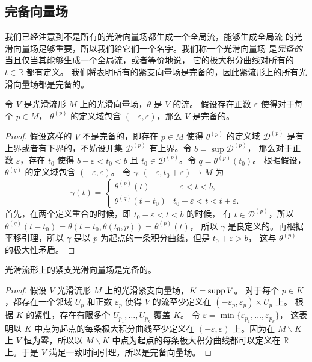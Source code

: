 \subsection{完备向量场}

我们已经注意到不是所有的光滑向量场都生成一个全局流，能够生成全局流
的光滑向量场足够重要，所以我们给它们一个名字。我们称一个光滑向量场
是\emph{完备的}当且仅当其能够生成一个全局流，或者等价地说，
它的极大积分曲线对所有的 $t\in \mathbb{R}$ 都有定义。
我们将表明所有的紧支向量场是完备的，因此紧流形上的所有光滑向量场都是完备的。

\begin{lemma}[一致时间引理]
  令 $V$ 是光滑流形 $M$ 上的光滑向量场，$\theta$ 是 $V$ 的流。
  假设存在正数 $\varepsilon$ 使得对于每个 $p\in M$，
  $\theta^{(p)}$ 的定义域包含 $(-\varepsilon,\varepsilon)$，那么 $V$
  是完备的。
\end{lemma}
\begin{proof}
  假设这样的 $V$ 不是完备的，即存在 $p\in M$ 使得 $\theta^{(p)}$ 的定义域
  $\mathcal{D}^{(p)}$ 是有上界或者有下界的，不妨设开集 $\mathcal D^{(p)}$ 有上界。令 $b=\sup \mathcal{D}^{(p)}$，
  那么对于正数 $\varepsilon$，存在 $t_0$ 使得 $b-\varepsilon<t_0<b$
  且 $t_0\in \mathcal D^{(p)}$。令 $q=\theta^{(p)}(t_0)$。
  根据假设，$\theta^{(q)}$ 的定义域包含 $(-\varepsilon,\varepsilon)$。
  令 $\gamma:(-\varepsilon,t_0+\varepsilon)\to M$ 为
  \[
    \gamma(t)=\begin{cases}
      \theta^{(p)}(t) & -\varepsilon<t< b,\\
      \theta^{(q)}(t-t_0) & t_0-\varepsilon< t<t+\varepsilon.
    \end{cases}
  \]
  首先，在两个定义重合的时候，即 $t_0-\varepsilon<t<b$ 的时候，
  有 $t\in \mathcal{D}^{(p)}$，所以 $\theta^{(q)}(t-t_0)
  =\theta(t-t_0,\theta(t_0,p))=\theta^{(p)}(t)$，
  所以 $\gamma$ 是良定义的。再根据平移引理，所以 $\gamma$
  是以 $p$ 为起点的一条积分曲线，但是 $t_0+\varepsilon>b$，
  这与 $\theta^{(p)}$ 的极大性矛盾。
\end{proof}

\begin{theorem}
  光滑流形上的紧支光滑向量场是完备的。
\end{theorem}
\begin{proof}
  假设 $V$ 光滑流形 $M$ 上的光滑紧支向量场，$K=\operatorname{supp} V$。
  对于每个 $p\in K$，都存在一个邻域 $U_p$ 和正数 $\varepsilon_p$
  使得 $V$ 的流至少定义在 $(-\varepsilon_p,\varepsilon_p)\times U_p$ 上。
  根据 $K$ 的紧性，存在有限多个 $U_{p_1},\dots,U_{p_k}$ 覆盖 $K$。
  令 $\varepsilon=\min\{\varepsilon_{p_1},\dots,\varepsilon_{p_k}\}$，
  这表明以 $K$ 中点为起点的每条极大积分曲线至少定义在 $(-\varepsilon,\varepsilon)$
  上。因为在 $M\smallsetminus K$ 上 $V$ 恒为零，所以以 $M\smallsetminus K$ 
  中点为起点的每条极大积分曲线都可以定义在 $\mathbb{R}$ 上。于是
  $V$ 满足一致时间引理，所以是完备向量场。
\end{proof}

